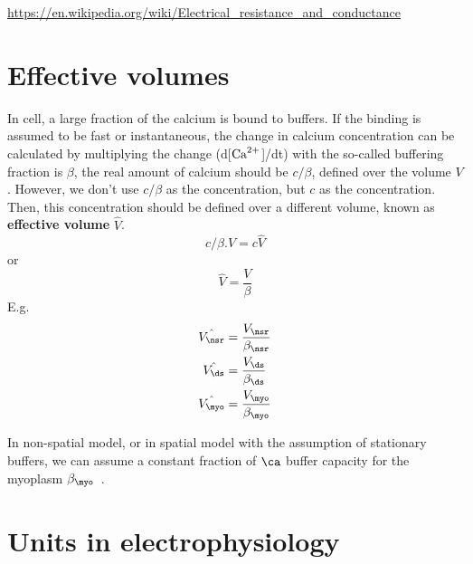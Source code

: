 \url{https://en.wikipedia.org/wiki/Electrical_resistance_and_conductance}


\section{Effective volumes}
\label{sec:effective-volumes}

In cell, a large fraction of the calcium is bound to buffers. If the binding is
assumed to be fast or instantaneous, the change in calcium concentration can be
calculated by multiplying the change (d[${\text{Ca}^{2+}}$]/dt) with the so-called buffering 
fraction is $\beta$, the real amount of calcium should be $c/\beta$, defined
over the volume $V$. However, we don't use $c/\beta$ as the concentration, but
$c$ as the concentration. Then, this concentration should be defined over a 
different volume, known as {\bf effective volume} $\hat{V}$. 
\begin{equation}
  \label{eq:1412}
  c/\beta.V = c\hat{V}
\end{equation}
or
\begin{equation}
  \label{eq:1411}
  \hat{V} = \frac{V}{\beta}
\end{equation}
E.g.
\begin{equation}
  \label{eq:1009}
  \begin{split}
    \hat{V_\nsr} &= \frac{V_\nsr}{\beta_\nsr} \\
    \hat{V_\ds} &= \frac{V_\ds}{\beta_\ds}\\ 
    \hat{V_\myo} &= \frac{V_\myo}{\beta_\myo} 
  \end{split}
\end{equation}

In non-spatial model, or in spatial model with the assumption of
stationary buffers, we can assume a constant fraction of $\ca$ buffer
capacity for the myoplasm $\beta_\myo$~\citep{williams2007pda}.

\section{Units in electrophysiology}



